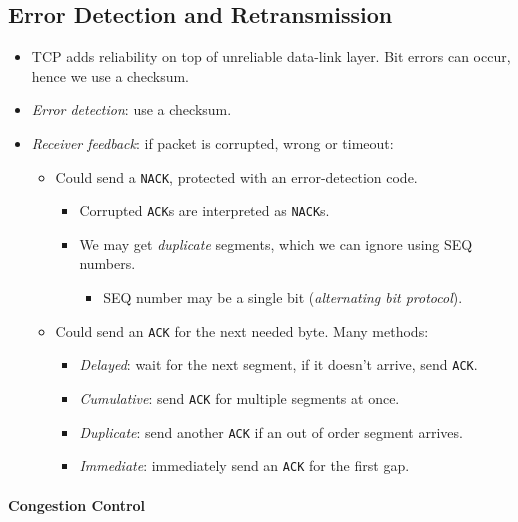\documentclass[twocolumn,english]{article}
\begin{document}
\subsection{Error Detection and Retransmission}
\begin{itemize}
\item TCP adds reliability on top of unreliable data-link layer. Bit errors
can occur, hence we use a checksum.
\item \emph{Error detection}: use a checksum.
\item \emph{Receiver feedback}: if packet is corrupted, wrong or timeout:
\begin{itemize}
\item Could send a \texttt{NACK}, protected with an error-detection code.
\begin{itemize}
\item Corrupted \texttt{ACK}s are interpreted as \texttt{NACK}s.
\item We may get \emph{duplicate} segments, which we can ignore using SEQ
numbers.
\begin{itemize}
\item SEQ number may be a single bit (\emph{alternating bit protocol}).
\end{itemize}
\end{itemize}
\item Could send an \texttt{ACK} for the next needed byte. Many methods:
\begin{itemize}
\item \emph{Delayed}: wait for the next segment, if it doesn't arrive, send
\texttt{ACK}.
\item \emph{Cumulative}: send \texttt{ACK} for multiple segments at once.
\item \emph{Duplicate}: send another \texttt{ACK} if an out of order segment
arrives.
\item \emph{Immediate}: immediately send an \texttt{ACK} for the first gap.
\end{itemize}
\end{itemize}
\end{itemize}

\paragraph{Congestion Control}
\end{document}
